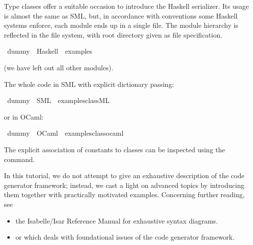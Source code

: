 \begin{isabellebody}
\begin{isamarkuptext}
Type classes offer a suitable occasion to introduce
  the Haskell serializer.  Its usage is almost the same
  as SML, but, in accordance with conventions
  some Haskell systems enforce, each module ends
  up in a single file. The module hierarchy is reflected in
  the file system, with root directory given as file specification.%
\end{isamarkuptext}%
\isamarkuptrue%
\isamarkupfalse%
\ dummy\ \ Haskell\ \ {\isachardoublequoteopen}examples{\isacharslash}{\isachardoublequoteclose}%
\begin{isamarkuptext}%
  \noindent (we have left out all other modules).

  \medskip

  The whole code in SML with explicit dictionary passing:%
\end{isamarkuptext}%
\isamarkuptrue%
\isamarkupfalse%
\ dummy\ \ SML\ \ {\isachardoublequoteopen}examples{\isacharslash}class{\isachardot}ML{\isachardoublequoteclose}%
\begin{isamarkuptext}%

  \medskip

  \noindent or in OCaml:%
\end{isamarkuptext}%
\isamarkuptrue%
\isamarkupfalse%
\ dummy\ \ OCaml\ \ {\isachardoublequoteopen}examples{\isacharslash}class{\isachardot}ocaml{\isachardoublequoteclose}%
\begin{isamarkuptext}%

  \medskip The explicit association of constants
  to classes can be inspected using the \isa{{\isasymPRINTCLASSES}}
  command.%
\end{isamarkuptext}%
\isamarkuptrue%
%
\isamarkuptrue%
%
\begin{isamarkuptext}%
In this tutorial, we do not attempt to give an exhaustive
  description of the code generator framework; instead,
  we cast a light on advanced topics by introducing
  them together with practically motivated examples.  Concerning
  further reading, see

  \begin{itemize}

  \item the Isabelle/Isar Reference Manual \cite{isabelle-isar-ref}
    for exhaustive syntax diagrams.
  \item or \fixme[ref] which deals with foundational issues
    of the code generator framework.


\end{itemize}
\end{isamarkuptext}
\end{isabellebody}
